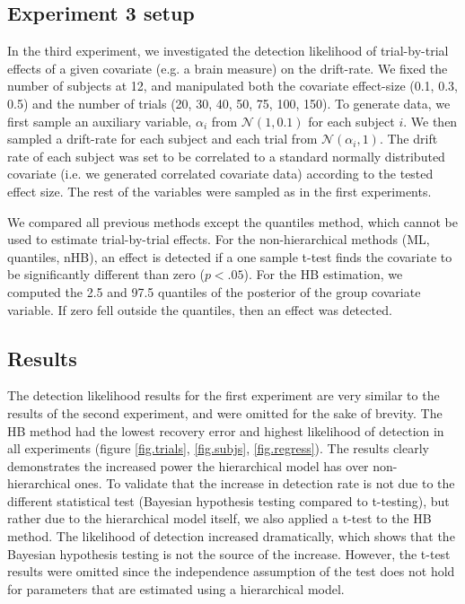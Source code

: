 \documentclass[letterpaper,10pt,english]{article}
\begin{document}
\subsection*{Experiment 3 setup}
In the third experiment, we investigated the detection likelihood of
trial-by-trial effects of a given covariate (e.g. a brain measure) on
the drift-rate. We fixed the number of subjects at 12, and manipulated
both the covariate effect-size (0.1, 0.3, 0.5) and the number of
trials (20, 30, 40, 50, 75, 100, 150). To generate data, we first
sample an auxiliary variable, $\alpha_i$ from $\mathcal{N}(1, 0.1)$
for each subject $i$. We then sampled a drift-rate for each subject
and each trial from $\mathcal{N}(\alpha_i, 1)$. The drift rate of each
subject was set to be correlated to a standard normally distributed
covariate (i.e. we generated correlated covariate data) according to
the tested effect size. The rest of the variables were sampled as in
the first experiments.

We compared all previous methods except the quantiles method, which
cannot be used to estimate trial-by-trial effects. For the
non-hierarchical methods (ML, quantiles, nHB), an effect is detected
if a one sample t-test finds the covariate to be significantly
different than zero ($p < .05$). For the HB estimation, we computed
the 2.5 and 97.5 quantiles of the posterior of the group covariate
variable. If zero fell outside the quantiles, then an effect was
detected.

\subsection*{Results}
The detection likelihood results for the first experiment are very similar to the results of the second experiment, and were omitted for the sake of brevity. The HB method had the lowest recovery error and highest likelihood of detection in all experiments (figure \ref{fig.trials}, \ref{fig.subjs}, \ref{fig.regress}). The results clearly demonstrates the increased power the hierarchical model has over non-hierarchical ones. To validate that the increase in detection rate is not due to the different statistical test (Bayesian hypothesis testing compared to t-testing), but rather due to the hierarchical model itself, we also applied a t-test to the HB method. The likelihood of detection increased dramatically, which shows that the Bayesian hypothesis testing is not the source of the increase. However, the t-test results were omitted since the independence assumption of the test does not hold for parameters that are estimated using a hierarchical model.
\end{document}
